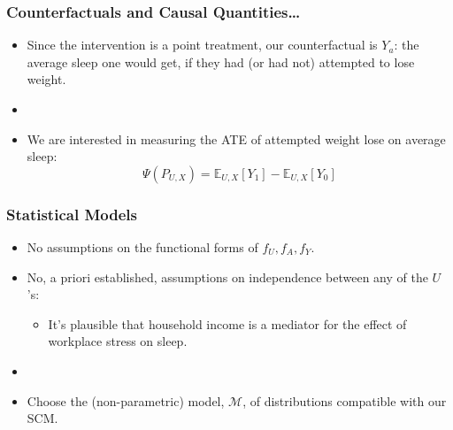 \documentclass{beamer}
\newcommand{\E}{\mathbb{E}}
\newcommand{\M}{\mathcal{M}}
\begin{document}
\begin{frame}
 \frametitle{Counterfactuals and Causal Quantities\ldots}
  \begin{itemize}
    \item  Since the intervention is a point treatment, our counterfactual is $Y_{a}$: the average sleep one would get, if they had (or had not) attempted to lose weight.
    \item[]
    \item  We are interested in measuring the ATE of attempted weight lose on average sleep:
    \[
      \Psi(P_{U,X}) = \E_{U,X}[Y_1] - \E_{U,X}[Y_0]
    \]
  \end{itemize}
 \end{frame}

\begin{frame}
 \frametitle{Statistical Models}
 \begin{itemize}
  \item No assumptions on the functional forms of $f_U, f_A, f_Y$.
  \item No, a priori established, assumptions on independence between any of the $U$'s:
    \begin{itemize}
     \item It's plausible that household income is a mediator for the effect of workplace stress on sleep.
    \end{itemize}
  \item[]
  \item Choose the (non-parametric) model, $\M$, of distributions compatible with our SCM.
 \end{itemize}
\end{frame}
\end{document}
